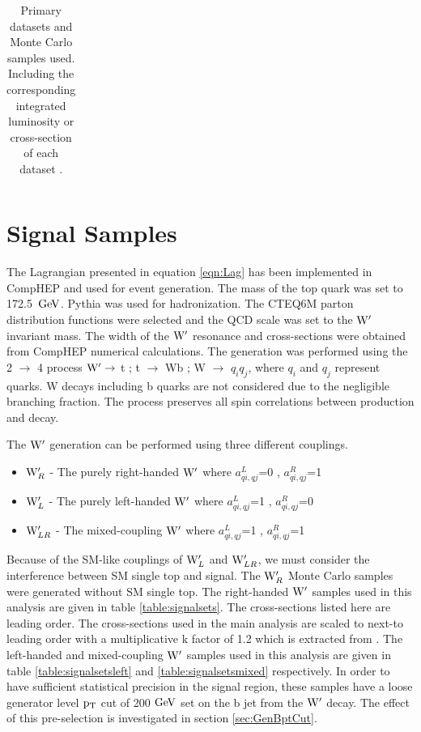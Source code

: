 \begin{table}
\begin{center}
\begin{tabular}{|p{0.7\linewidth}|c|}
\end{tabular}
\end{center}
\caption{Primary datasets and Monte Carlo samples used. Including the corresponding integrated luminosity or cross-section of each dataset \cite{Czakon:2013goa,Kidonakis:2012db}.}
\label{table:datasets}
\end{table}

\section{Signal Samples}
\label{sec:signal}
The Lagrangian presented in equation \ref{eqn:Lag} has been implemented in CompHEP \cite{CompHEP} and used for event generation.  The mass of the top 
quark was set to 172.5~$\mathrm{GeV}$.  
Pythia was used for hadronization. The CTEQ6M parton distribution functions were selected and the QCD scale was set to the $\mathrm{W}^\prime$ invariant mass.  The width of 
the $\mathrm{W}^\prime$ resonance and cross-sections were obtained from CompHEP numerical calculations.  The generation was performed using the 2 $\rightarrow$ 4 
process $\mathrm{W}^\prime \rightarrow$ t ; t $\rightarrow$ Wb ; W $\rightarrow$ $q_{i}q_{j}$, where $q_{i}$ and $q_{j}$ represent quarks.  
W decays including b quarks are not considered due to the negligible branching fraction.  The process 
preserves all spin correlations between production and decay.

The $\mathrm{W}^\prime$ generation can be performed using three different couplings. 
\begin{itemize}
\item {\bf $\mathrm{W}^\prime_{R}$} - The purely right-handed $\mathrm{W}^\prime$ where $a_{qi,qj}^{L}$=0 , $a_{qi,qj}^{R}$=1 
\item {\bf $\mathrm{W}^\prime_{L}$} - The purely left-handed $\mathrm{W}^\prime$ where $a_{qi,qj}^{L}$=1 , $a_{qi,qj}^{R}$=0 
\item {\bf $\mathrm{W}^\prime_{LR}$} - The mixed-coupling $\mathrm{W}^\prime$ where $a_{qi,qj}^{L}$=1 , $a_{qi,qj}^{R}$=1 
\end{itemize}

Because of the SM-like couplings of $\mathrm{W}^\prime_{L}$ and $\mathrm{W}^\prime_{LR}$, we must consider the 
interference between SM single top and signal.  The $\mathrm{W}^\prime_{R}$ Monte Carlo samples were generated without SM single top.  The right-handed $\mathrm{W}^\prime$ samples used in this analysis are given in table
\ref{table:signalsets}.  The cross-sections listed here are leading order.  The cross-sections 
used in the main analysis are scaled to next-to leading order with a multiplicative k factor of 1.2
which is extracted from \cite{kfactor}.  The left-handed and mixed-coupling $\mathrm{W}^\prime$ samples used 
in this analysis are given in table \ref{table:signalsetsleft} and \ref{table:signalsetsmixed} respectively.
In order to have sufficient statistical precision in the signal region, these samples have a loose generator 
level $\mathrm{p_{T}}$ cut of 200$~\mathrm{GeV}$ set on the b jet from the $\mathrm{W}^\prime$ decay.  The effect of this pre-selection is investigated in section \ref{sec:GenBptCut}.

